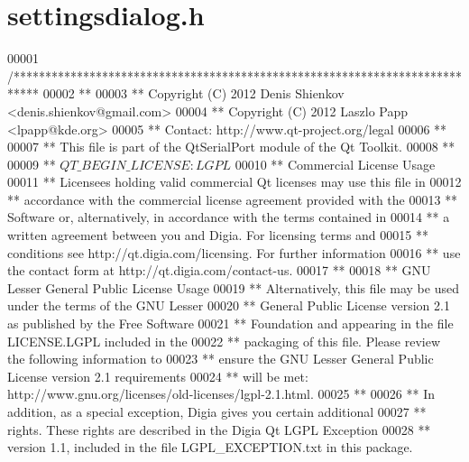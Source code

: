 \hypertarget{a00132_source}{\section{settingsdialog.\+h}
\label{a00132_source}
}

\begin{DoxyCode}
00001 \textcolor{comment}{/****************************************************************************}
00002 \textcolor{comment}{**}
00003 \textcolor{comment}{** Copyright (C) 2012 Denis Shienkov <denis.shienkov@gmail.com>}
00004 \textcolor{comment}{** Copyright (C) 2012 Laszlo Papp <lpapp@kde.org>}
00005 \textcolor{comment}{** Contact: http://www.qt-project.org/legal}
00006 \textcolor{comment}{**}
00007 \textcolor{comment}{** This file is part of the QtSerialPort module of the Qt Toolkit.}
00008 \textcolor{comment}{**}
00009 \textcolor{comment}{** $QT\_BEGIN\_LICENSE:LGPL$}
00010 \textcolor{comment}{** Commercial License Usage}
00011 \textcolor{comment}{** Licensees holding valid commercial Qt licenses may use this file in}
00012 \textcolor{comment}{** accordance with the commercial license agreement provided with the}
00013 \textcolor{comment}{** Software or, alternatively, in accordance with the terms contained in}
00014 \textcolor{comment}{** a written agreement between you and Digia.  For licensing terms and}
00015 \textcolor{comment}{** conditions see http://qt.digia.com/licensing.  For further information}
00016 \textcolor{comment}{** use the contact form at http://qt.digia.com/contact-us.}
00017 \textcolor{comment}{**}
00018 \textcolor{comment}{** GNU Lesser General Public License Usage}
00019 \textcolor{comment}{** Alternatively, this file may be used under the terms of the GNU Lesser}
00020 \textcolor{comment}{** General Public License version 2.1 as published by the Free Software}
00021 \textcolor{comment}{** Foundation and appearing in the file LICENSE.LGPL included in the}
00022 \textcolor{comment}{** packaging of this file.  Please review the following information to}
00023 \textcolor{comment}{** ensure the GNU Lesser General Public License version 2.1 requirements}
00024 \textcolor{comment}{** will be met: http://www.gnu.org/licenses/old-licenses/lgpl-2.1.html.}
00025 \textcolor{comment}{**}
00026 \textcolor{comment}{** In addition, as a special exception, Digia gives you certain additional}
00027 \textcolor{comment}{** rights.  These rights are described in the Digia Qt LGPL Exception}
00028 \textcolor{comment}{** version 1.1, included in the file LGPL\_EXCEPTION.txt in this package.}

\end{DoxyCode}
